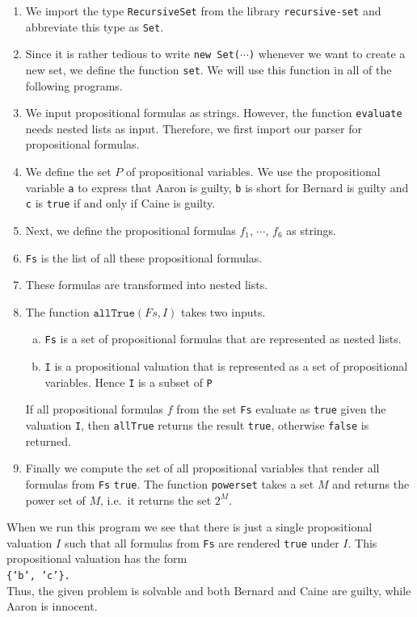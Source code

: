 \begin{enumerate}
\item We import the type \texttt{RecursiveSet} from the library \texttt{recursive-set} and abbreviate
      this type as \texttt{Set}.
\item Since it is rather tedious to write \texttt{new Set($\cdots$)} whenever we want to create a new
      set, we define the function \texttt{set}.  We will use this function in all of the following programs.
\item We input propositional formulas as strings.  However, the function \texttt{evaluate} needs nested lists
      as input.  Therefore, we first import our parser for propositional formulas.
\item We define the set $P$ of propositional variables.  We use the propositional variable \texttt{a} to
      express that Aaron is guilty, \texttt{b} is short for Bernard is guilty and \texttt{c} is \texttt{true} if and
      only if Caine is guilty. 
\item Next, we define the propositional formulas $f_1$, $\cdots$, $f_6$ as strings.
\item \texttt{Fs} is the list of all these propositional formulas.
\item These formulas are transformed into nested lists.
\item The function $\texttt{allTrue}(Fs, I)$ takes two inputs.
      \begin{enumerate}[(a)]
      \item \texttt{Fs} is a set of propositional formulas that are represented as nested lists.
      \item \texttt{I} is a propositional valuation that is represented as a set of propositional variables.
            Hence \texttt{I} is a subset of \texttt{P}
      \end{enumerate}
      If all propositional formulas $f$ from the set \texttt{Fs} evaluate as \texttt{true} given the valuation
      \texttt{I}, then \texttt{allTrue} returns the result \texttt{true}, otherwise \texttt{false} is returned.
\item Finally we compute the set of all propositional variables that render all formulas from \texttt{Fs} \texttt{true}.
      The function \texttt{powerset} takes a set $M$ and returns the power set of $M$, i.e.~it returns the set $2^M$.
\end{enumerate}
When we run this program we see that there is just a single propositional valuation $I$ such that all formulas
from \texttt{Fs} are rendered \texttt{true} under $I$.  This propositional valuation has the form
\\[0.2cm]
\hspace*{1.3cm}
\texttt{\{'b', 'c'\}.}
\\[0.2cm]
Thus, the given problem is solvable and both Bernard and Caine are guilty, while Aaron is innocent.

